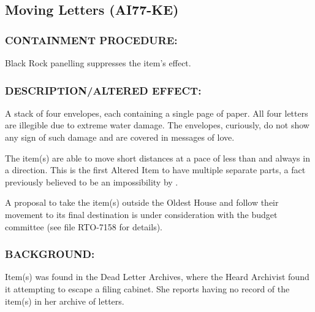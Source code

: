 \subsection*{Moving Letters (AI77-KE)}
\subsubsection*{CONTAINMENT PROCEDURE:}
\par Black Rock panelling suppresses the
item's effect.
\subsubsection*{DESCRIPTION/ALTERED EFFECT:}
\par A stack of four envelopes, each
containing a single page of paper. All
four letters are illegible due to extreme
water damage. The envelopes, curiously,
do not show any sign of such damage and are covered in
messages of love.
\par The item(s) are able to move short distances at a pace of less
than  and always in a  direction. This is
the first Altered Item to have multiple separate parts, a fact
previously believed to be an impossibility by .
\par A proposal to take the item(s) outside the Oldest House and
follow their movement to its final destination is under
consideration with the budget committee (see file RTO-7158 for
details).
\subsubsection*{BACKGROUND:}
\par Item(s) was found in the Dead Letter Archives, where the Heard
Archivist found it attempting to escape a filing cabinet. She
reports having no record of the item(s) in her archive of letters.